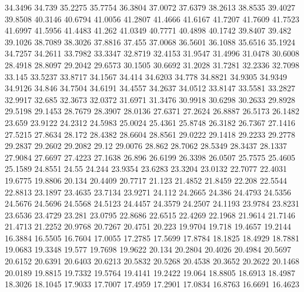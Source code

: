 34.3496      34.739      35.2275      35.7754      36.3804      37.0072      37.6379      38.2613      38.8535      39.4027      39.8508      40.3146      40.6794      41.0056      41.2807      41.4666      41.6167      41.7207      41.7609      41.7523      41.6997      41.5956      41.4483      41.262      41.0349      40.7771      40.4898      40.1742      39.8407      39.482      39.1026      38.7089      38.3026      37.8816      37.455      37.0068      36.5601      36.1088      35.6516      35.1924      34.7257      34.2611      33.7982      33.3347      32.8719      32.4153      31.9547      31.4996      31.0478      30.6008      
28.4918      28.8097      29.2042      29.6573      30.1505      30.6692      31.2028      31.7281      32.2336      32.7098      33.145      33.5237      33.8717      34.1567      34.414      34.6203      34.778      34.8821      34.9305      34.9349      34.9126      34.846      34.7504      34.6191      34.4557      34.2637      34.0512      33.8147      33.5581      33.2827      32.9917      32.685      32.3673      32.0372      31.6971      31.3476      30.9918      30.6298      30.2633      29.8928      29.5198      29.1453      28.7679      28.3907      28.0136      27.6371      27.2624      26.8887      26.5173      26.1482      
23.659      23.9122      24.2312      24.5983      25.0024      25.4361      25.8748      26.3182      26.7367      27.1416      27.5215      27.8634      28.172      28.4382      28.6604      28.8561      29.0222      29.1418      29.2233      29.2778      29.2837      29.2602      29.2082      29.12      29.0076      28.862      28.7062      28.5349      28.3437      28.1337      27.9084      27.6697      27.4223      27.1638      26.896      26.6199      26.3398      26.0507      25.7575      25.4605      25.1589      24.8551      24.55      24.244      23.9354      23.6283      23.3204      23.0132      22.7077      22.4031      
19.6775      19.8806      20.134      20.4409      20.7717      21.123      21.4852      21.8459      22.208      22.5544      22.8813      23.1897      23.4635      23.7134      23.9271      24.112      24.2665      24.386      24.4793      24.5356      24.5676      24.5696      24.5568      24.5123      24.4457      24.3579      24.2507      24.1193      23.9784      23.8231      23.6536      23.4729      23.281      23.0795      22.8686      22.6515      22.4269      22.1968      21.9614      21.7146      21.4713      21.2252      20.9768      20.7267      20.4751      20.223      19.9704      19.718      19.4657      19.2144      
16.3884      16.5505      16.7604      17.0055      17.2785      17.5699      17.8784      18.1825      18.4929      18.7881      19.0683      19.3348      19.577      19.7698      19.9622      20.134      20.2804      20.4026      20.4984      20.5697      20.6152      20.6391      20.6403      20.6213      20.5832      20.5268      20.4538      20.3652      20.2622      20.1468      20.0189      19.8815      19.7332      19.5764      19.4141      19.2422      19.064      18.8805      18.6913      18.4987      18.3026      18.1045      17.9033      17.7007      17.4959      17.2901      17.0834      16.8763      16.6691      16.4623      
